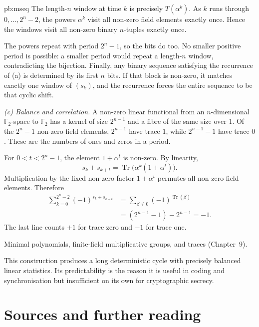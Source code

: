 \begin{solution}{pb:mseq}
The length-$n$ window at time $k$ is precisely $T(\alpha^k)$. As $k$ runs through $0,\ldots,2^n-2$, the powers $\alpha^k$ visit all non-zero field elements exactly once. Hence the windows visit all non-zero binary $n$-tuples exactly once.

The powers repeat with period $2^n-1$, so the bits do too. No smaller positive period is possible: a smaller period would repeat a length-$n$ window, contradicting the bijection. Finally, any binary sequence satisfying the recurrence of (a) is determined by its first $n$ bits. If that block is non-zero, it matches exactly one window of $(s_k)$, and the recurrence forces the entire sequence to be that cyclic shift.

\emph{(c) Balance and correlation.}
A non-zero linear functional from an $n$-dimensional $\mathbb F_2$-space to $\mathbb F_2$ has a kernel of size $2^{n-1}$ and a fibre of the same size over $1$. Of the $2^n-1$ non-zero field elements, $2^{n-1}$ have trace $1$, while $2^{n-1}-1$ have trace $0$. These are the numbers of ones and zeros in a period.

For $0<t<2^n-1$, the element $1+\alpha^t$ is non-zero. By linearity,
\[
s_k+s_{k+t}
=\operatorname{Tr}\bigl(\alpha^k(1+\alpha^t)\bigr).
\]
Multiplication by the fixed non-zero factor $1+\alpha^t$ permutes all non-zero field elements. Therefore
\[
\begin{aligned}
\sum_{k=0}^{2^n-2}(-1)^{s_k+s_{k+t}}
&=\sum_{\beta\ne0}(-1)^{\operatorname{Tr}(\beta)}\\
&=(2^{n-1}-1)-2^{n-1}=\boxed{-1}.
\end{aligned}
\]
The last line counts $+1$ for trace zero and $-1$ for trace one.

\tools Minimal polynomials, finite-field multiplicative groups, and traces (Chapter~9).

\leads This construction produces a long deterministic cycle with precisely balanced linear statistics. Its predictability is the reason it is useful in coding and synchronisation but insufficient on its own for cryptographic secrecy.
\end{solution}

\section*{Sources and further reading}

